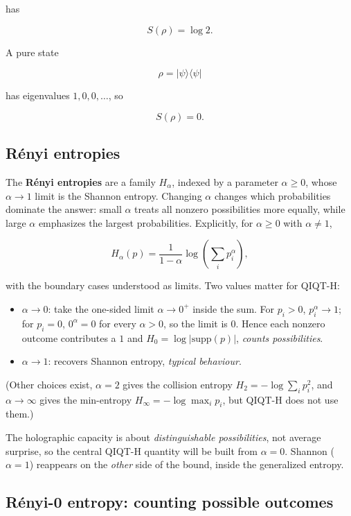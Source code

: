 \documentclass[11pt,a4paper]{article}
\begin{document}
has

\[
S(\rho)=\log 2.
\]

A pure state

\[
\rho=|\psi\rangle\langle\psi|
\]

has eigenvalues $1,0,0,\dots$, so

\[
S(\rho)=0.
\]

\subsection{Rényi entropies}

The \textbf{Rényi entropies} are a family $H_\alpha$, indexed by a parameter $\alpha \ge 0$, whose $\alpha \to 1$ limit is the Shannon entropy. Changing $\alpha$ changes which probabilities dominate the answer: small $\alpha$ treats all nonzero possibilities more equally, while large $\alpha$ emphasizes the largest probabilities. Explicitly, for $\alpha \ge 0$ with $\alpha \ne 1$,

\[
H_\alpha(p)=\frac{1}{1-\alpha}\log\left(\sum_i p_i^\alpha\right),
\]

with the boundary cases understood as limits. Two values matter for QIQT-H:

\begin{itemize}
  \item $\alpha \to 0$: take the one-sided limit $\alpha \to 0^+$ inside the sum. For $p_i > 0$, $p_i^\alpha \to 1$; for $p_i = 0$, $0^\alpha = 0$ for every $\alpha > 0$, so the limit is $0$. Hence each nonzero outcome contributes a $1$ and $H_0 = \log|\mathrm{supp}(p)|$, \emph{counts possibilities}.
  \item $\alpha \to 1$: recovers Shannon entropy, \emph{typical behaviour}.
\end{itemize}

(Other choices exist, $\alpha = 2$ gives the collision entropy $H_2 = -\log\sum_i p_i^2$, and $\alpha \to \infty$ gives the min-entropy $H_\infty = -\log\max_i p_i$, but QIQT-H does not use them.)

The holographic capacity is about \emph{distinguishable possibilities}, not average surprise, so the central QIQT-H quantity will be built from $\alpha = 0$. Shannon ($\alpha = 1$) reappears on the \emph{other} side of the bound, inside the generalized entropy.

\subsection{Rényi-0 entropy: counting possible outcomes}
\end{document}
